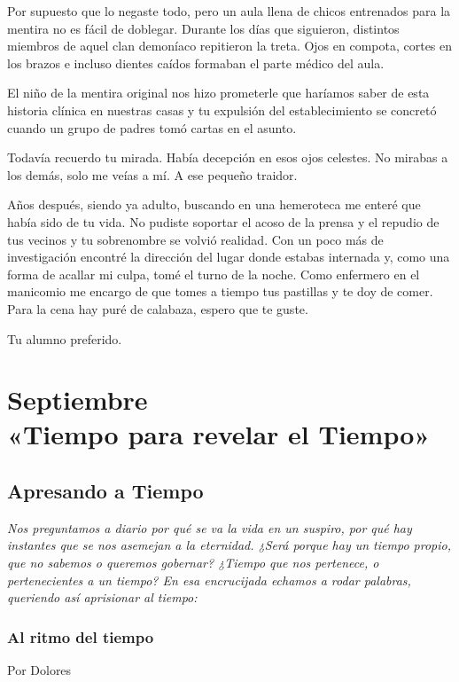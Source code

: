 \documentclass[11pt,twoside,openright,a5paper]{book}
\begin{document}
Por supuesto que lo negaste todo, pero un aula llena de chicos entrenados para la mentira no es fácil de doblegar. Durante los días que siguieron, distintos miembros de aquel clan demoníaco repitieron la treta. Ojos en compota, cortes en los brazos e incluso dientes caídos formaban el parte médico del aula.

El niño de la mentira original nos hizo prometerle que haríamos saber de esta historia clínica en nuestras casas y tu expulsión del establecimiento se concretó cuando un grupo de padres tomó cartas en el asunto.

Todavía recuerdo tu mirada. Había decepción en esos ojos celestes. No mirabas a los demás, solo me veías a mí. A ese pequeño traidor.

Años después, siendo ya adulto, buscando en una hemeroteca me enteré que había sido de tu vida. No pudiste soportar el acoso de la prensa y el repudio de tus vecinos y tu sobrenombre se volvió realidad. Con un poco más de investigación encontré la dirección del lugar donde estabas internada y, como una forma de acallar mi culpa, tomé el turno de la noche. Como enfermero en el manicomio me encargo de que tomes a tiempo tus pastillas y te doy de comer. Para la cena hay puré de calabaza, espero que te guste.

Tu alumno preferido.

\part*{Septiembre\\«Tiempo para revelar el Tiempo»}

\chapter*{Apresando a Tiempo}

\vspace{0.5cm}
\emph{Nos preguntamos a diario por qué se va la vida en un suspiro, por qué hay instantes que se nos asemejan a la eternidad. ¿Será porque hay un tiempo propio, que no sabemos o queremos gobernar? ¿Tiempo que nos pertenece, o pertenecientes a un tiempo? En esa encrucijada echamos a rodar palabras, queriendo así aprisionar al tiempo:}

\section*{Al ritmo del tiempo}
                                                                                    \begin{flushright}Por Dolores\end{flushright}
\end{document}
